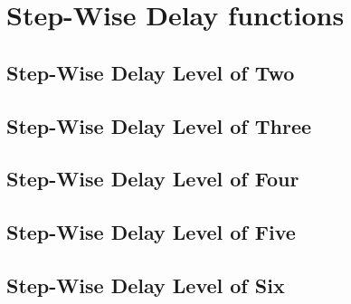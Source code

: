 \section{Step-Wise Delay functions}


\subsection{Step-Wise Delay Level of Two}

\subsection{Step-Wise Delay Level of Three}

\subsection{Step-Wise Delay Level of Four}

\subsection{Step-Wise Delay Level of Five}

\subsection{Step-Wise Delay Level of Six}



